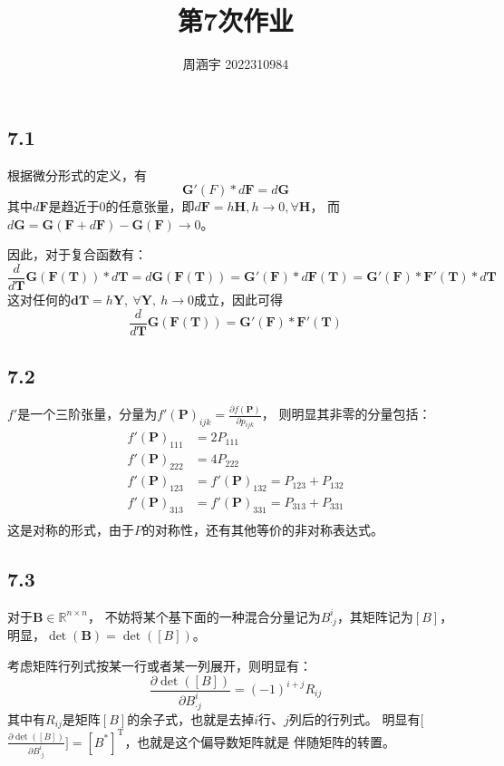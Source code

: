 \documentclass[UTF8,zihao=5]{ctexart}
\title{{\bfseries 第7次作业}}
\author{周涵宇 2022310984}
\date{}
\newcommand{\bm}[1]{{\mathbf{#1}}}
\newcommand{\trans}[0]{^\mathrm{T}}
\newcommand*{\pd}[2]{\frac{\partial #1}{\partial #2}}
\begin{document}
\maketitle

\subsection*{7.1}

根据微分形式的定义，有
$$
    \bm{G}'(F)*d\bm{F}=d\bm{G}
$$
其中$d\bm{F}$是趋近于0的任意张量，即$d\bm{F}=h\bm{H},h\rightarrow 0,\forall \bm{H}$，
而$d\bm{G}=\bm{G}(\bm{F}+d\bm{F})-\bm{G}(\bm{F})\rightarrow 0$。

因此，对于复合函数有：
$$
    \frac{d}{d\bm{T}}\bm{G}(\bm{F}(\bm{T}))*d\bm{T}
    =d\bm{G}(\bm{F}(\bm{T}))=\bm{G}'(\bm{F})*d\bm{F}(\bm{T})
    =\bm{G}'(\bm{F})*\bm{F}'(\bm{T})*d\bm{T}
$$
这对任何的$\bm{dT}=h\bm{Y},\  \forall\bm{Y},\  h\rightarrow 0$成立，因此可得
$$
    \frac{d}{d\bm{T}}\bm{G}(\bm{F}(\bm{T}))
    =\bm{G}'(\bm{F})*\bm{F}'(\bm{T})
$$

\subsection*{7.2}
$f'$是一个三阶张量，分量为$f'(\bm{P})_{ijk}=\pd{f(\bm{P})}{p_{ijk}}$，
则明显其非零的分量包括：
$$
    \begin{aligned}
        f'(\bm{P})_{111}&=2P_{111}                         \\
        f'(\bm{P})_{222}&=4P_{222}                         \\
        f'(\bm{P})_{123}&=f'(\bm{P})_{132}=P_{123}+P_{132} \\
        f'(\bm{P})_{313}&=f'(\bm{P})_{331}=P_{313}+P_{331} \\
    \end{aligned}
$$
这是对称的形式，由于$P$的对称性，还有其他等价的非对称表达式。


\subsection*{7.3} 

对于$\bm{B} \in \mathbb{R}^{n\times n}$，
不妨将某个基下面的一种混合分量记为$B^i_{\cdot j}$，其矩阵记为$[B]$，
明显，$\det(\bm{B})=\det([B])$。

考虑矩阵行列式按某一行或者某一列展开，则明显有：
$$
\pd{\det([B])}{B^i_{\cdot j}}=(-1)^{i+j}R_{ij}
$$
其中有$R_{ij}$是矩阵$[B]$的余子式，也就是去掉$i$行、$j$列后的行列式。
明显有[$\pd{\det([B])}{B^i_{\cdot j}}]=[B^*]\trans$，也就是这个偏导数矩阵就是
伴随矩阵的转置。
\end{document}

